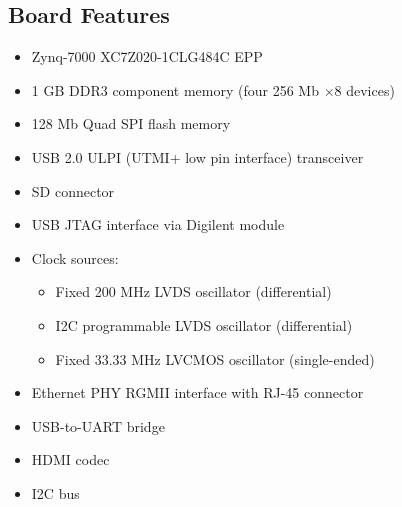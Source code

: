 \subsection{Board Features}
\label{specs:fpga:features}
\label{zynq:features}
\nocite{Zynq7000:UserGuide}
\begin{itemize}
    \item Zynq-7000 XC7Z020-1CLG484C \gls{EPP}
    \item 1 GB \gls{DDR}3 component memory (four 256 Mb $\times 8$ devices)
    \item 128 Mb Quad \gls{SPI} flash memory
    \item \gls{USB} 2.0 ULPI (UTMI+ low pin interface) transceiver
    \item \gls{SD} connector
    \item \gls{USB} \gls{JTAG} interface via Digilent module
    \item Clock sources:
    \begin{itemize}
        \item Fixed 200 MHz \gls{LVDS} oscillator (differential)
        \item \gls{I2C} programmable \gls{LVDS} oscillator (differential)
        \item Fixed 33.33 MHz \gls{LVCMOS} oscillator (single-ended)
    \end{itemize}
    \item Ethernet \gls{PHY} \gls{RGMII} interface with RJ-45 connector
    \item \gls{USB}-to-\gls{UART} bridge
    \item \gls{HDMI} codec
    \item \gls{I2C} bus


\end{itemize}

